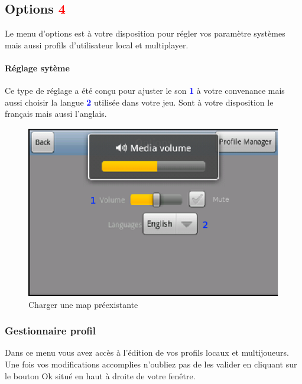 \subsection{Options \textcolor{red}{4}}
	Le menu d'options est à votre disposition pour régler vos paramètre systèmes
	mais aussi profils d'utilisateur local et multiplayer.
	
	\paragraph{Réglage sytème\\}
	Ce type de réglage a été conçu pour ajuster le son
	\textcolor{blue}{\textbf{1}} à votre convenance mais aussi choisir la langue
	\textcolor{blue}{\textbf{2}} utilisée dans votre jeu. Sont à votre disposition
	le français mais aussi l'anglais.
	
	\begin{figure}[h]
	\centering
		\includegraphics[scale=0.7]{Manuel/Img/4.eps}
		\caption{Charger une map préexistante}
	\end{figure}
	
	\subsubsection{Gestionnaire profil}
		Dans ce menu vous avez accès à l'édition de vos profils locaux et
		multijoueurs. Une fois vos modifications accomplies n'oubliez pas de les
		valider en cliquant sur le bouton Ok situé en haut à droite de votre fenêtre.
